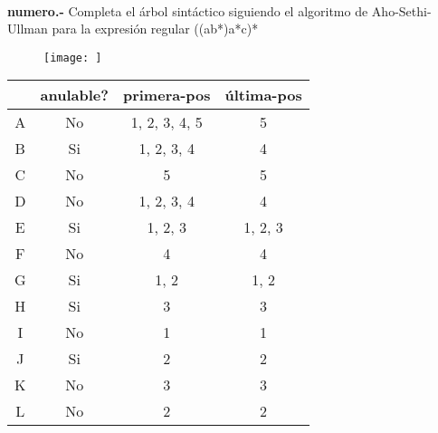 \paragraph{}
\textbf{{numero}.-} Completa el árbol sintáctico siguiendo el algoritmo de Aho-Sethi-Ullman para la expresión regular ((a\textbar b*)a*c)*
\begin{figure}[ht!]
\centering
\texttt{[image: ]}
\end{figure}

\begin{tabular} {| c | c | c | c |}\hline
 & anulable? & primera-pos & última-pos\\ \hline
A & No & 1, 2, 3, 4, 5 & 5\\ \hline
B & Si & 1, 2, 3, 4 & 4\\ \hline
C & No & 5 & 5\\ \hline
D & No & 1, 2, 3, 4 & 4\\ \hline
E & Si & 1, 2, 3 & 1, 2, 3\\ \hline
F & No & 4 & 4\\ \hline
G & Si & 1, 2 & 1, 2\\ \hline
H & Si & 3 & 3\\ \hline
I & No & 1 & 1\\ \hline
J & Si & 2 & 2\\ \hline
K & No & 3 & 3\\ \hline
L & No & 2 & 2\\ \hline
\end{tabular}